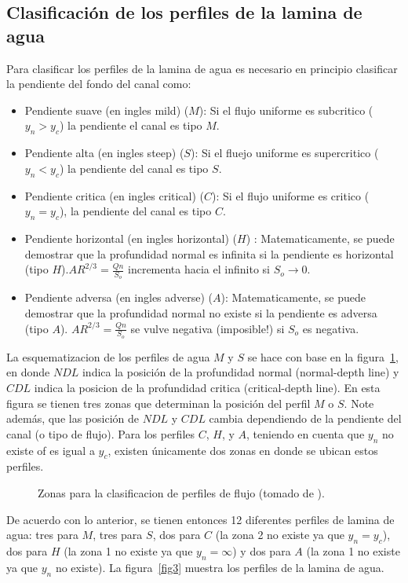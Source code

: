 \documentclass[11pt, oneside]{article}
\begin{document}
\subsection{Clasificaci\'on de los perfiles de la lamina de agua}
Para clasificar los perfiles de la lamina de agua es necesario en principio clasificar la pendiente del fondo del canal como:
\begin{itemize}
    \item Pendiente suave (en ingles mild) ($M$): Si el flujo uniforme es subcritico ($y_n > y_c$) la pendiente el canal es tipo $M$.
    \item Pendiente alta (en ingles steep) ($S$): Si el fluejo uniforme es supercritico ($y_n < y_c$) la pendiente del canal es tipo $S$.
    \item Pendiente critica (en ingles critical) ($C$): Si el flujo uniforme es critico ($y_n = y_c$), la pendiente del canal es tipo $C$.
    \item Pendiente horizontal (en ingles horizontal) ($H$) : Matematicamente, se puede demostrar que la profundidad normal es infinita si la pendiente es horizontal (tipo $H$).$A R ^{2/3} = \frac{Q n}{S_o}$ incrementa hacia el infinito si $S_o \rightarrow 0$. 
    \item Pendiente adversa (en ingles adverse) ($A$): Matematicamente, se puede demostrar que la profundidad normal no existe si la pendiente es adversa (tipo $A$). $A R ^{2/3} = \frac{Q n}{S_o}$ se vulve negativa (imposible!) si $S_o$ es negativa.
\end{itemize}

La esquematizacion de los perfiles de agua $M$ y $S$ se hace con base en la figura~\ref{fig2}, en donde $NDL$ indica la posici\'on de la profundidad normal (normal-depth line) y $CDL$ indica la posicion de la profundidad critica (critical-depth line). En esta figura se tienen tres zonas que determinan la posici\'on del perfil $M$ o $S$. Note adem\'as, que las posici\'on de $NDL$ y $CDL$ cambia dependiendo de la pendiente del canal (o tipo de flujo). Para los perfiles $C$, $H$, y $A$, teniendo en cuenta que $y_n$ no existe of es igual a $y_c$, existen \'unicamente dos zonas en donde se ubican estos perfiles. 

\begin{figure}[h]
\centering
\caption{Zonas para la clasificacion de perfiles de flujo (tomado de \cite{Chau}).}
\label{fig2}
\end{figure}

De acuerdo con lo anterior, se tienen entonces 12 diferentes perfiles de lamina de agua: tres para $M$, tres para $S$, dos para $C$ (la zona 2 no existe ya que $y_n = y_c$), dos para $H$ (la zona 1 no existe ya que $y_n = \infty$) y dos para $A$ (la zona 1 no existe ya que $y_n$ no existe). La figura~\ref{fig3} muestra los perfiles de la lamina de agua.
\end{document}
